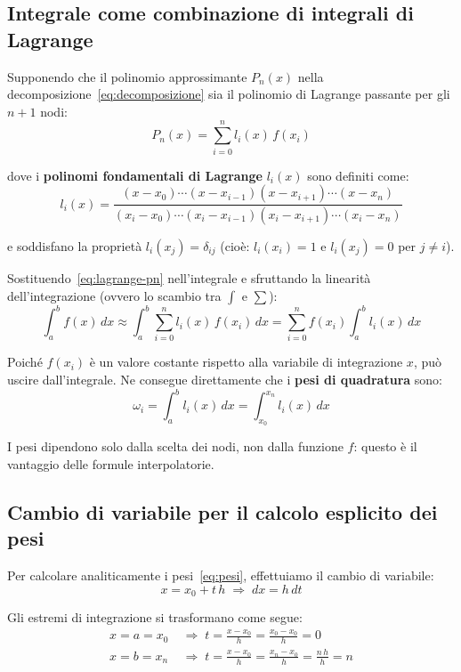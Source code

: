 \documentclass[a4paper,12pt]{article}
\theoremstyle{definition}
\theoremstyle{remark}
\begin{document}
\subsection{Integrale come combinazione di integrali di Lagrange}

Supponendo che il polinomio approssimante $P_n(x)$ nella
decomposizione~\eqref{eq:decomposizione} sia il polinomio di Lagrange
passante per gli $n+1$ nodi:
\begin{equation}
  P_n(x) = \sum_{i=0}^{n} l_i(x)\,f(x_i)
  \label{eq:lagrange-pn}
\end{equation}

\noindent dove i \textbf{polinomi fondamentali di Lagrange} $l_i(x)$ sono
definiti come:
\begin{equation}
  l_i(x) = \frac{(x-x_0)\cdots(x-x_{i-1})(x-x_{i+1})\cdots(x-x_n)}
                 {(x_i-x_0)\cdots(x_i-x_{i-1})(x_i-x_{i+1})\cdots(x_i-x_n)}
  \label{eq:lagrange-li}
\end{equation}

\noindent e soddisfano la proprietà $l_i(x_j) = \delta_{ij}$
(cioè: $l_i(x_i) = 1$ e $l_i(x_j) = 0$ per $j \ne i$).

Sostituendo~\eqref{eq:lagrange-pn} nell'integrale e sfruttando la
linearità dell'integrazione (ovvero lo scambio tra $\int$ e $\sum$):
\[
  \int_a^b f(x)\,dx
  \approx \int_a^b \sum_{i=0}^{n} l_i(x)\,f(x_i)\,dx
  = \sum_{i=0}^{n} f(x_i)\int_a^b l_i(x)\,dx
\]

\noindent Poiché $f(x_i)$ è un valore costante rispetto alla variabile di
integrazione $x$, può uscire dall'integrale.
Ne consegue direttamente che i \textbf{pesi di quadratura} sono:
\begin{equation}
  \boxed{\omega_i = \int_a^b l_i(x)\,dx = \int_{x_0}^{x_n} l_i(x)\,dx}
  \label{eq:pesi}
\end{equation}

I pesi dipendono solo dalla scelta dei nodi, non dalla funzione $f$:
questo è il vantaggio delle formule interpolatorie.

\subsection{Cambio di variabile per il calcolo esplicito dei pesi}

Per calcolare analiticamente i pesi~\eqref{eq:pesi}, effettuiamo il
cambio di variabile:
\[
  x = x_0 + t\,h \;\Longrightarrow\; dx = h\,dt
\]

Gli estremi di integrazione si trasformano come segue:
\begin{align*}
  x = a = x_0 &\;\Rightarrow\;
    t = \frac{x - x_0}{h} = \frac{x_0 - x_0}{h} = 0 \\[4pt]
  x = b = x_n &\;\Rightarrow\;
    t = \frac{x - x_0}{h} = \frac{x_n - x_0}{h} = \frac{n\,h}{h} = n
\end{align*}
\end{document}
